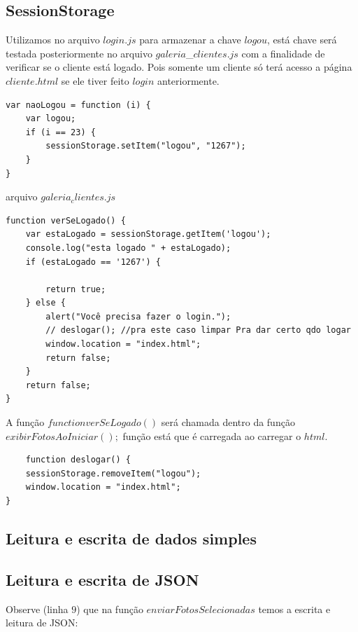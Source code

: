 \subsection{SessionStorage}

	Utilizamos no arquivo $login.js$ para armazenar a chave $logou$, está chave será testada posteriormente no arquivo $galeria$\_$clientes.js$ com a finalidade de verificar se o cliente está logado. Pois somente um cliente só terá acesso a página $cliente.html$ se ele tiver feito $login$ anteriormente. 
	
\begin{lstlisting}
var naoLogou = function (i) {
    var logou;
    if (i == 23) {
        sessionStorage.setItem("logou", "1267");
    }
}
\end{lstlisting}

arquivo $galeria_clientes.js$

\begin{lstlisting}
function verSeLogado() {
    var estaLogado = sessionStorage.getItem('logou');
    console.log("esta logado " + estaLogado);
    if (estaLogado == '1267') {

        return true;
    } else {
        alert("Você precisa fazer o login.");
        // deslogar(); //pra este caso limpar Pra dar certo qdo logar 
        window.location = "index.html";
        return false;
    }
    return false;
}
\end{lstlisting}

	A função $function verSeLogado()$ será chamada dentro da função $exibirFotosAoIniciar();$ função está que é carregada ao carregar o $html$.
	
\begin{lstlisting}
	function deslogar() {
    sessionStorage.removeItem("logou");
    window.location = "index.html";
}
\end{lstlisting}
\subsection{Leitura e escrita de dados simples}
\subsection{Leitura e escrita de JSON}
	Observe (linha $9$) que na função $enviarFotosSelecionadas$ temos a escrita e leitura de JSON:
	
